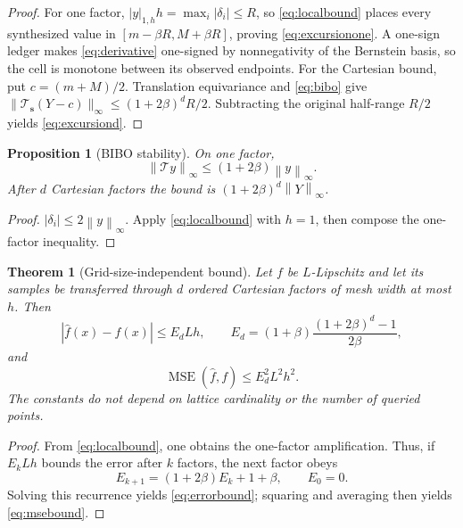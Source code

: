 \documentclass[journal]{IEEEtran}
\newtheorem{theorem}{Theorem}
\newtheorem{proposition}{Proposition}
\newcommand{\Tcal}{\mathcal{T}}
\newcommand{\norm}[1]{\left\lVert#1\right\rVert}
\begin{document}
\begin{proof}
For one factor, \( |y|_{1,h}h=\max_i|\delta_i|\leq R\), so
\eqref{eq:localbound} places every synthesized value in
\([m-\beta R,M+\beta R]\), proving \eqref{eq:excursionone}. A one-sign ledger
makes \eqref{eq:derivative} one-signed by nonnegativity of the Bernstein
basis, so the cell is monotone between its observed endpoints. For the
Cartesian bound, put \(c=(m+M)/2\). Translation equivariance and
\eqref{eq:bibo} give
\(\lVert\Tcal_{\bm s}(Y-c)\rVert_\infty
 \leq(1+2\beta)^dR/2\). Subtracting the original half-range \(R/2\) yields
\eqref{eq:excursiond}.
\end{proof}

\begin{proposition}[BIBO stability]
On one factor,
\begin{equation}
 \norm{\Tcal y}_\infty\leq(1+2\beta)\norm{y}_\infty.
 \label{eq:bibo}
\end{equation}
After \(d\) Cartesian factors the bound is
\((1+2\beta)^d\norm{Y}_\infty\).
\end{proposition}

\begin{proof}
\(|\delta_i|\leq2\norm{y}_\infty\). Apply
\eqref{eq:localbound} with \(h=1\), then compose the one-factor inequality.
\end{proof}

\begin{theorem}[Grid-size-independent bound]
Let \(f\) be \(L\)-Lipschitz and let its samples be transferred through
\(d\) ordered Cartesian factors of mesh width at most \(h\). Then
\begin{equation}
 |\widehat f(x)-f(x)|\leq E_dLh,\qquad
 E_d=(1+\beta)\frac{(1+2\beta)^d-1}{2\beta},
 \label{eq:errorbound}
\end{equation}
and
\begin{equation}
 \operatorname{MSE}(\widehat f,f)\leq E_d^2L^2h^2.
 \label{eq:msebound}
\end{equation}
The constants do not depend on lattice cardinality or the number of queried
points.
\end{theorem}

\begin{proof}
From \eqref{eq:localbound}, one obtains the one-factor amplification. Thus,
if \(E_kLh\) bounds the error after \(k\) factors, the next factor obeys
\[
 E_{k+1}=(1+2\beta)E_k+1+\beta,\qquad E_0=0.
\]
Solving this recurrence yields \eqref{eq:errorbound}; squaring and averaging
then yields \eqref{eq:msebound}.
\end{proof}
\end{document}
